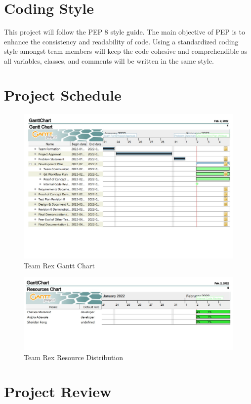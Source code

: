 \documentclass{article}
\begin{document}
	\section{Coding Style}
	This project will follow the PEP 8 style guide. The main objective of PEP is to enhance the consistency and readability of code. Using a standardized coding style amongst team members will keep the code cohesive and comprehendible as all variables, classes, and comments will be written in the same style. 
	
	\section{Project Schedule}


		\begin{figure}[h]
			\centering
			\includegraphics[scale=0.9,angle=90]{ganttChart}
			\caption{Team Rex Gantt Chart}
		\end{figure}		
	
		\begin{figure}[h]
			\centering
			\includegraphics[scale=0.9,angle=90]{resource}
			\caption{Team Rex Resource Distribution}
		\end{figure}		
	
	
	\section{Project Review}
	
\end{document}
